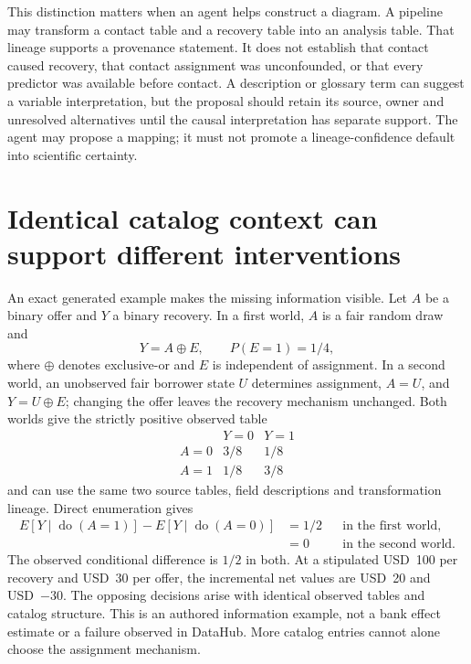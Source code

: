 This distinction matters when an agent helps construct a diagram. A pipeline
may transform a contact table and a recovery table into an analysis table.
That lineage supports a provenance statement. It does not establish that
contact caused recovery, that contact assignment was unconfounded, or that
every predictor was available before contact. A description or glossary term
can suggest a variable interpretation, but the proposal should retain its
source, owner and unresolved alternatives until the causal interpretation has
separate support. The agent may propose a mapping; it must not promote a
lineage-confidence default into scientific certainty.
\citep{exec16_dh_primary,exec16_dh_contract}

\section{Identical catalog context can support different interventions}

An exact generated example makes the missing information visible. Let $A$ be
a binary offer and $Y$ a binary recovery. In a first world, $A$ is a fair
random draw and
\[
 Y=A\mathbin{\oplus}E,\qquad P(E=1)=1/4,
\]
where $\oplus$ denotes exclusive-or and $E$ is independent of assignment.
In a second world, an unobserved fair borrower state $U$ determines assignment,
$A=U$, and $Y=U\mathbin{\oplus}E$; changing the offer leaves the recovery
mechanism unchanged. Both worlds give the strictly positive observed table
\[
 \begin{array}{c|cc}
 &Y=0&Y=1\\\hline
 A=0&3/8&1/8\\
 A=1&1/8&3/8
 \end{array}
\]
and can use the same two source tables, field descriptions and transformation
lineage. Direct enumeration gives
\[
 \begin{aligned}
 E[Y\mid\operatorname{do}(A=1)]-E[Y\mid\operatorname{do}(A=0)]
 &=1/2 &&\text{in the first world},\\
 &=0 &&\text{in the second world}.
 \end{aligned}
\]
The observed conditional difference is $1/2$ in both. At a stipulated USD~100
per recovery and USD~30 per offer, the incremental net values are USD~20 and
USD~$-30$. The opposing decisions arise with identical observed tables and
catalog structure. This is an authored information example, not a bank effect
estimate or a failure observed in DataHub. More catalog entries cannot alone
choose the assignment mechanism. \citep{exec16_dh_exact}

